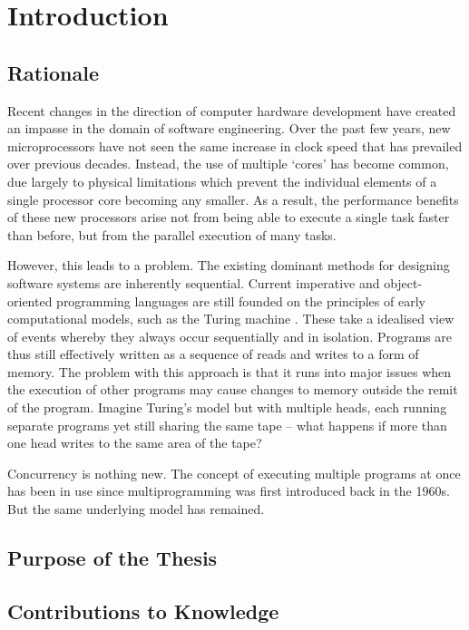 \chapter{Introduction}
\label{introduction}

\section{Rationale}

Recent changes in the direction of computer hardware development have
created an impasse in the domain of software engineering.  Over the
past few years, new microprocessors have not seen the same increase in
clock speed that has prevailed over previous decades.  Instead, the
use of multiple `cores' has become common, due largely to physical
limitations which prevent the individual elements of a single
processor core becoming any smaller.  As a result, the performance
benefits of these new processors arise not from being able to execute
a single task faster than before, but from the parallel execution of
many tasks.

However, this leads to a problem.  The existing dominant methods for
designing software systems are inherently sequential.  Current
imperative and object-oriented programming languages are still founded
on the principles of early computational models, such as the Turing
machine \cite{turing:36}.  These take a idealised view of events
whereby they always occur sequentially and in isolation.  Programs are
thus still effectively written as a sequence of reads and writes to a
form of memory.  The problem with this approach is that it runs into
major issues when the execution of other programs may cause changes to
memory outside the remit of the program.  Imagine Turing's model but
with multiple heads, each running separate programs yet still sharing
the same tape -- what happens if more than one head writes to the same
area of the tape?

Concurrency is nothing new.  The concept of executing multiple
programs at once has been in use since multiprogramming was first
introduced back in the 1960s.  But the same underlying model has
remained.

\section{Purpose of the Thesis}

\section{Contributions to Knowledge}

